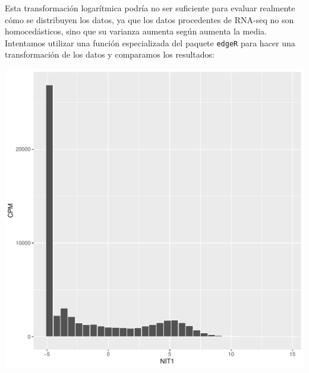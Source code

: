 \documentclass[
  english,
]{article}
\newenvironment{Shaded}{\begin{snugshade}}{\end{snugshade}}
\newcommand{\DataTypeTok}[1]{\textcolor[rgb]{0.13,0.29,0.53}{#1}}
\newcommand{\DecValTok}[1]{\textcolor[rgb]{0.00,0.00,0.81}{#1}}
\newcommand{\ErrorTok}[1]{\textcolor[rgb]{0.64,0.00,0.00}{\textbf{#1}}}
\newcommand{\FloatTok}[1]{\textcolor[rgb]{0.00,0.00,0.81}{#1}}
\newcommand{\KeywordTok}[1]{\textcolor[rgb]{0.13,0.29,0.53}{\textbf{#1}}}
\newcommand{\NormalTok}[1]{#1}
\newcommand{\OperatorTok}[1]{\textcolor[rgb]{0.81,0.36,0.00}{\textbf{#1}}}
\newcommand{\OtherTok}[1]{\textcolor[rgb]{0.56,0.35,0.01}{#1}}
\newcommand{\StringTok}[1]{\textcolor[rgb]{0.31,0.60,0.02}{#1}}
\begin{document}
Esta transformación logarítmica podría no ser suficiente para evaluar
realmente cómo se distribuyen los datos, ya que los datos procedentes de
RNA-seq no son homocedásticos, sino que su varianza aumenta según
aumenta la media. Intentamos utilizar una función especializada del
paquete \texttt{edgeR} para hacer una transformación de los datos y
comparamos los resultados:

\begin{Shaded}
\end{Shaded}

\includegraphics{ortega_rita_ADO_PEC2_files/figure-latex/cpm pseudocount-1.pdf}
\end{document}
